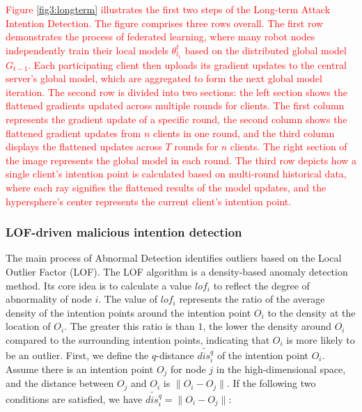 \documentclass[lettersize,journal]{IEEEtran}
\begin{document}
\textcolor{red}{Figure \ref{fig3:longterm} illustrates the first two steps of the Long-term Attack Intention Detection. The figure comprises three rows overall. The first row demonstrates the process of federated learning, where many robot nodes independently train their local models \( \theta^t_{l_1} \) based on the distributed global model \( G_{t-1} \). Each participating client then uploads its gradient updates to the central server's global model, which are aggregated to form the next global model iteration. The second row is divided into two sections: the left section shows the flattened gradients updated across multiple rounds for clients. The first column represents the gradient update of a specific round, the second column shows the flattened gradient updates from \( n \) clients in one round, and the third column displays the flattened updates across \( T \) rounds for \( n \) clients. The right section of the image represents the global model in each round. The third row depicts how a single client's intention point is calculated based on multi-round historical data, where each ray signifies the flattened results of the model updates, and the hypersphere's center represents the current client's intention point.}

\subsubsection{LOF-driven malicious intention detection}
The main process of Abnormal Detection identifies outliers based on the Local Outlier Factor (LOF). The LOF algorithm is a density-based anomaly detection method. Its core idea is to calculate a value $lof_i$ to reflect the degree of abnormality of node $i$. The value of $lof_i$ represents the ratio of the average density of the intention points around the intention point $O_i$ to the density at the location of $O_i$. The greater this ratio is than $1$, the lower the density around $O_i$ compared to the surrounding intention points, indicating that $O_i$ is more likely to be an outlier. First, we define the $q$-distance $\widetilde{dis_i^q}$ of the intention point $O_i$. Assume there is an intention point $O_j$ for node $j$ in the high-dimensional space, and the distance between $O_j$ and $O_i$ is $\|O_i-O_j\|$. If the following two conditions are satisfied, we have $\widetilde{dis_i^q} = \|O_i-O_j\|$:
\end{document}
